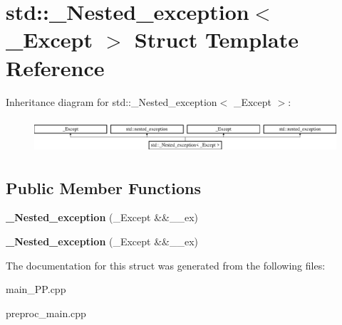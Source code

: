 \hypertarget{structstd_1_1__Nested__exception}{\section{std\+:\+:\+\_\+\+Nested\+\_\+exception$<$ \+\_\+\+Except $>$ Struct Template Reference}
\label{structstd_1_1__Nested__exception}
}
Inheritance diagram for std\+:\+:\+\_\+\+Nested\+\_\+exception$<$ \+\_\+\+Except $>$\+:\begin{figure}[H]
\begin{center}
\leavevmode
\includegraphics[height=1.284404cm]{structstd_1_1__Nested__exception}
\end{center}
\end{figure}
\subsection*{Public Member Functions}
\begin{DoxyCompactItemize}
\item 
\hypertarget{structstd_1_1__Nested__exception_a2e084959ad6a571c78f428e49f4df079}{{\bfseries \+\_\+\+Nested\+\_\+exception} (\+\_\+\+Except \&\&\+\_\+\+\_\+ex)}\label{structstd_1_1__Nested__exception_a2e084959ad6a571c78f428e49f4df079}

\item 
\hypertarget{structstd_1_1__Nested__exception_a2e084959ad6a571c78f428e49f4df079}{{\bfseries \+\_\+\+Nested\+\_\+exception} (\+\_\+\+Except \&\&\+\_\+\+\_\+ex)}\label{structstd_1_1__Nested__exception_a2e084959ad6a571c78f428e49f4df079}

\end{DoxyCompactItemize}


The documentation for this struct was generated from the following files\+:\begin{DoxyCompactItemize}
\item 
main\+\_\+\+P\+P.\+cpp\item 
preproc\+\_\+main.\+cpp\end{DoxyCompactItemize}
